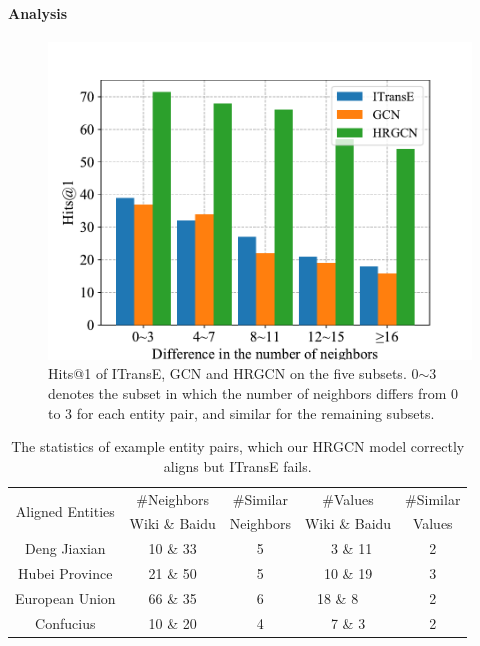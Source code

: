 	\paragraph{Analysis}
	\begin{figure}
		\begin{center}
			\includegraphics[width=1\linewidth]{figures/graph4.pdf}
			\caption{Hits@1 of ITransE, GCN and HRGCN on the five subsets. 0$\sim$3 denotes the subset in which the number of neighbors differs from 0 to 3 for each entity pair, and similar for the remaining subsets.}
			\label{subset}
		\end{center}
	\end{figure}
	\begin{table}
		\centering
		\small
		\begin{tabular}{ccccc}
			\toprule
			\multirow{2}{*}{Aligned Entities} & \#Neighbors & \#Similar & \#Values & \#Similar \\
			& Wiki \& Baidu & Neighbors & Wiki \& Baidu & Values \\
			\midrule
			Deng Jiaxian & 10 \& 33 & 5 & \ 3 \& 11 & 2\\
			Hubei Province & 21 \& 50 & 5 & 10 \& 19 & 3\\
			European Union & 66 \& 35 & 6 & 18 \& 8\ \ \ & 2\\
			Confucius & 10 \& 20 & 4 & 7 \& 3 & 2\\
			\bottomrule
		\end{tabular}
		\caption{The statistics of example entity pairs, which our HRGCN model correctly aligns but ITransE fails.}
		\label{example}
	\end{table}
	
